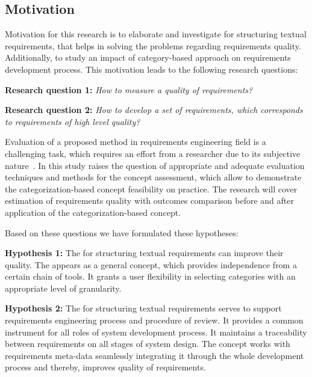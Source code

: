 \subsection{Motivation}
\label{sec:Motivation} 
Motivation for this research is to elaborate and investigate \cbc for structuring textual requirements, that helps in solving the problems regarding requirements quality. Additionally, to study an impact of category-based approach on requirements development process. This motivation leads to the following research questions: 

\textbf{Research question 1:} \textit{How to measure a quality of requirements?}

\textbf{Research question 2:} \textit{How to develop a set of requirements, which corresponds to requirements of high level quality?}

Evaluation of a proposed method in requirements engineering field is a challenging task, which requires an effort from a researcher due to its subjective nature~\cite{16NaPiRe}. In this study raises the question of appropriate and adequate evaluation techniques and methods for the concept assessment, which allow to demonstrate the categorization-based concept feasibility on practice. The research will cover estimation of requirements quality with outcomes comparison before and after application of the categorization-based concept.

Based on these questions we have formulated these hypotheses:

\textbf{Hypothesis 1:} The \cbc for structuring textual requirements can improve their quality. The \cc appears as a general concept, which provides independence from a certain chain of tools. It grants a user flexibility in selecting categories with an appropriate level of granularity. 

\textbf{Hypothesis 2:} The \cbc for structuring textual requirements serves to support requirements engineering process and procedure of review. It provides a common instrument for all roles of system development process. It maintains a traceability between requirements on all stages of system design. The concept works with requirements meta-data seamlessly integrating it through the whole development process and thereby, improves quality of requirements.

